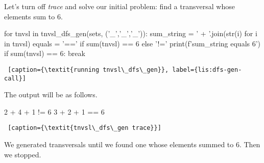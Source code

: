 Let's turn off \textit{trace} and solve our initial problem: find a transversal whose elements sum to 6.

\begin{minipage}[c]{0.45\textwidth}
\begin{python1}
for tnvsl in tnvsl_dfs_gen(sets, ('_','_','_')):
  sum_string = ' + '.join(str(i) for i in tnvsl)
  equals = '==' if sum(tnvsl) == 6 else '!='
  print(f'{sum_string} {equals} 6')
  if sum(tnvsl) == 6: break
\end{python1}\linv
\begin{lstlisting} [caption={\textit{running tnvsl\_dfs\_gen}}, label={lis:dfs-gen-call}]
\end{lstlisting}
\end{minipage}
\smallv
The output will be as follows.

\begin{minipage}[c]{0.45\textwidth}
\begin{python1}  
2 + 4 + 1 != 6
3 + 2 + 1 == 6
\end{python1}\linv
\begin{lstlisting} [caption={\textit{tnvsl\_dfs\_gen trace}}]
\end{lstlisting}
\end{minipage}

We generated transversals until we found one whose elements summed to 6. Then we stopped.
